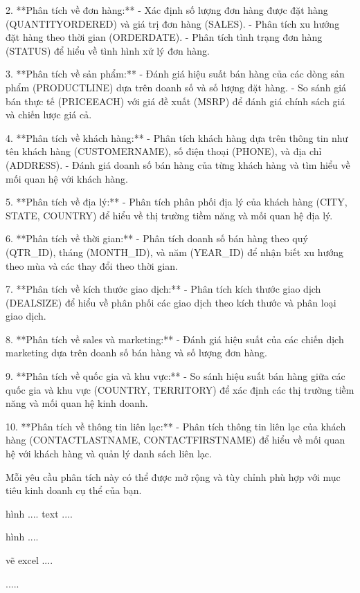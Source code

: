 \documentclass{article}
\begin{document}
2. **Phân tích về đơn hàng:**
   - Xác định số lượng đơn hàng được đặt hàng (QUANTITYORDERED) và giá trị đơn hàng (SALES).
   - Phân tích xu hướng đặt hàng theo thời gian (ORDERDATE).
   - Phân tích tình trạng đơn hàng (STATUS) để hiểu về tình hình xử lý đơn hàng.

3. **Phân tích về sản phẩm:**
   - Đánh giá hiệu suất bán hàng của các dòng sản phẩm (PRODUCTLINE) dựa trên doanh số và số lượng đặt hàng.
   - So sánh giá bán thực tế (PRICEEACH) với giá đề xuất (MSRP) để đánh giá chính sách giá và chiến lược giá cả.

4. **Phân tích về khách hàng:**
   - Phân tích khách hàng dựa trên thông tin như tên khách hàng (CUSTOMERNAME), số điện thoại (PHONE), và địa chỉ (ADDRESS).
   - Đánh giá doanh số bán hàng của từng khách hàng và tìm hiểu về mối quan hệ với khách hàng.

5. **Phân tích về địa lý:**
   - Phân tích phân phối địa lý của khách hàng (CITY, STATE, COUNTRY) để hiểu về thị trường tiềm năng và mối quan hệ địa lý.

6. **Phân tích về thời gian:**
   - Phân tích doanh số bán hàng theo quý (QTR_ID), tháng (MONTH_ID), và năm (YEAR_ID) để nhận biết xu hướng theo mùa và các thay đổi theo thời gian.

7. **Phân tích về kích thước giao dịch:**
   - Phân tích kích thước giao dịch (DEALSIZE) để hiểu về phân phối các giao dịch theo kích thước và phân loại giao dịch.

8. **Phân tích về sales và marketing:**
   - Đánh giá hiệu suất của các chiến dịch marketing dựa trên doanh số bán hàng và số lượng đơn hàng.

9. **Phân tích về quốc gia và khu vực:**
   - So sánh hiệu suất bán hàng giữa các quốc gia và khu vực (COUNTRY, TERRITORY) để xác định các thị trường tiềm năng và mối quan hệ kinh doanh.

10. **Phân tích về thông tin liên lạc:**
    - Phân tích thông tin liên lạc của khách hàng (CONTACTLASTNAME, CONTACTFIRSTNAME) để hiểu về mối quan hệ với khách hàng và quản lý danh sách liên lạc.

Mỗi yêu cầu phân tích này có thể được mở rộng và tùy chỉnh phù hợp với mục tiêu kinh doanh cụ thể của bạn.




hình ....
text ....




hình ....


vẽ excel ....


.....

\end{document}
